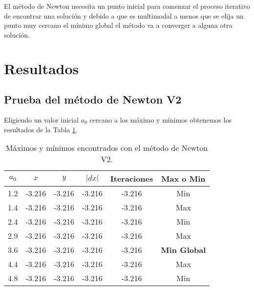 \documentclass[conference]{IEEEtran}
\begin{document}
El método de Newton necesita un punto inicial para comenzar el proceso iterativo de encontrar una solución y debido a que es multimodal a menos que se elija un punto muy cercano el mínimo global el método va a converger a alguna otra solución.

\section{Resultados}

\subsection{Prueba del método de Newton V2}
Eligiendo un valor inicial $a_{0}$ cercano a los máximo y mínimos obtenemos los resultados de la Tabla \ref{tab:res1}.

	\begin{table}[h!]   
	\caption{Máximos y mínimos encontrados con el método de Newton V2.}                                                                                                                
		\centering                                       
		\begin{tabular}{cccccc}
			\hline                                             
			$a_{0}$ & $x$ & $y$ & $|dx|$ & Iteraciones & Max o Min\\                     
			\hline 
			1.2 & -3.216 & -3.216 & -3.216 & -3.216 & Min\\                                            
			1.4 & -3.216 & -3.216 & -3.216 & -3.216 & Max\\                                            
			2.4 & -3.216 & -3.216 & -3.216 & -3.216 & Min\\                                            
			2.9 & -3.216 & -3.216 & -3.216 & -3.216 & Max\\                                            
			3.6 & -3.216 & -3.216 & -3.216 & -3.216 &\textbf{Min Global}\\                                            
			4.4 & -3.216 & -3.216 & -3.216 & -3.216 & Max\\                                            
			4.8 & -3.216 & -3.216 & -3.216 & -3.216 & Min\\                                            
			\hline                                             
		\end{tabular}
		\label{tab:res1}
	\end{table}	
\end{document}
